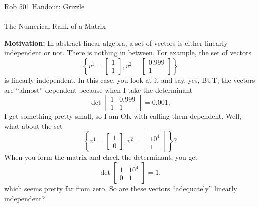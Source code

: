 \documentclass[letterpaper]{article}
\begin{document}

\baselineskip=48pt

\setlength{\parskip}{.3in}
\setlength{\itemsep}{.3in}

\pagestyle{plain}

{\Large \bf
\begin{center}
Rob 501 Handout: Grizzle \\
\mbox{} \\
The Numerical Rank of a Matrix
\end{center}
}



\Large


\noindent \textbf{Motivation:} In abstract linear algebra, a set of vectors is either linearly independent or not. There is nothing in between. For example, the set of vectors
$$\left\{ v^1 =  \left[ \begin{array}{l} 1 \\1 \end{array} \right] ,  v^2 =  \left[ \begin{array}{l} 0.999 \\1\end{array} \right] \right\}$$
is linearly independent. In this case, you look at it and say, yes, BUT, the vectors are ``almost'' dependent because when I take the determinant
$$ \det  \left[ \begin{array}{ll} 1 & 0.999 \\1 & 1\end{array} \right] = 0.001,$$
I get something pretty small, so I am OK with calling them dependent. Well, what about the set
$$\left\{ v^1 =  \left[ \begin{array}{l} 1 \\0 \end{array} \right] ,  v^2 =  \left[ \begin{array}{l} 10^4 \\1 \end{array} \right] \right\} ?$$
When you form the matrix and check the determinant, you get
$$ \det  \left[ \begin{array}{ll} 1 & 10^4 \\0& 1\end{array} \right] = 1,$$
which seems pretty far from zero. So are these vectors ``adequately'' linearly independent?
\end{document}
